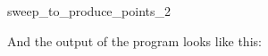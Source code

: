 \begin{ccRefFunction}[CGAL::]{sweep_to_produce_points_2}

And the output of the program looks like this:


\end{ccRefFunction}




